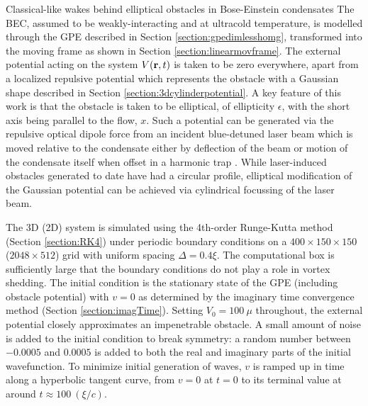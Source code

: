 \begin{chapter}{\label{cha:wake}Classical-like wakes behind elliptical obstacles in Bose-Einstein condensates}
The BEC, assumed to be weakly-interacting and at ultracold temperature, is modelled through the GPE described in Section \ref{section:gpedimlesshomg}, transformed into the moving frame as shown in Section \ref{section:linearmovframe}. The external potential acting on the system $V({\bf r}, t)$ is taken to be zero everywhere, apart from a localized repulsive potential which represents the obstacle with a Gaussian shape described in Section \ref{section:3dcylinderpotential}. A key feature of this work is that the obstacle is taken to be elliptical, of ellipticity $\epsilon$, with the short axis being parallel to the flow, $x$. Such a potential can be generated via the repulsive optical dipole force from an incident blue-detuned laser beam which is moved relative to the condensate either by deflection of the beam \cite{Raman,Onofrio,Inouye} or motion of the condensate itself when offset in a harmonic trap \cite{Neely}.  While laser-induced obstacles generated to date have had a circular profile, elliptical modification of the Gaussian potential can be achieved via cylindrical focussing of the laser beam.   

The 3D (2D) system is simulated using the 4th-order Runge-Kutta method (Section \ref{section:RK4}) under periodic boundary conditions on a $400 \times 150 \times 150$ ($2048 \times 512$) grid with uniform spacing $\Delta=0.4\xi$. The computational box is sufficiently large that the boundary conditions do not play a role in vortex shedding.  The initial condition is the stationary state of the GPE (including obstacle potential) with $v=0$ as determined by the imaginary time convergence method (Section \ref{section:imagTime}). Setting $V_0=100~\mu$ throughout, the external potential closely approximates an impenetrable obstacle. A small amount of noise is added to the initial condition to break symmetry: a random number between $-0.0005$ and $0.0005$ is added to both the real and imaginary parts of the initial wavefunction. To minimize initial generation of waves, $v$ is ramped up in time along a hyperbolic tangent curve, from $v=0$ at $t=0$ to its terminal value at around $t\approx100~(\xi/c)$.


\end{chapter}

